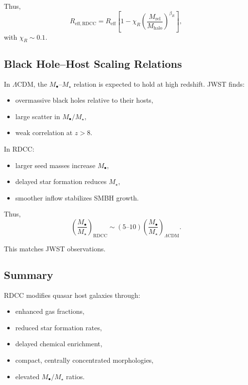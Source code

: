 \documentclass[11pt,a4paper]{article}
\begin{document}
Thus,
\begin{equation}
R_{\mathrm{eff,RDCC}}
=
R_{\mathrm{eff}}
\left[
1
-
\chi_{R}
\left(
\frac{M_{\mathrm{rel}}}{M_{\mathrm{halo}}}
\right)^{\beta_{R}}
\right],
\end{equation}
with $\chi_{R} \sim 0.1$.

\subsection{Black Hole–Host Scaling Relations}

In $\Lambda$CDM, the $M_{\bullet}$–$M_{\star}$ relation is expected to hold at high redshift.
JWST finds:
\begin{itemize}
\item overmassive black holes relative to their hosts,
\item large scatter in $M_{\bullet}/M_{\star}$,
\item weak correlation at $z > 8$.
\end{itemize}

In RDCC:
\begin{itemize}
\item larger seed masses increase $M_{\bullet}$,
\item delayed star formation reduces $M_{\star}$,
\item smoother inflow stabilizes SMBH growth.
\end{itemize}

Thus,
\begin{equation}
\left(
\frac{M_{\bullet}}{M_{\star}}
\right)_{\mathrm{RDCC}}
\sim
(5\text{--}10)
\left(
\frac{M_{\bullet}}{M_{\star}}
\right)_{\Lambda\mathrm{CDM}}.
\end{equation}

This matches JWST observations.

\subsection{Summary}

RDCC modifies quasar host galaxies through:
\begin{itemize}
\item enhanced gas fractions,
\item reduced star formation rates,
\item delayed chemical enrichment,
\item compact, centrally concentrated morphologies,
\item elevated $M_{\bullet}/M_{\star}$ ratios.
\end{itemize}
\end{document}
